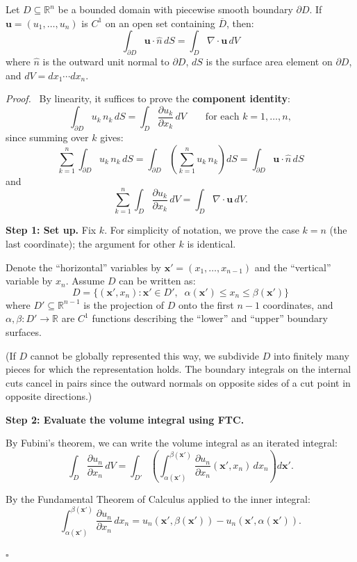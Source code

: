 \documentclass[11pt]{report}
\renewenvironment{proof}[1][Proof]{\par\noindent\textit{#1.}\ }{\hfill$\square$\par\medskip}
\newcommand{\R}{\mathbb{R}}
\newcommand{\parti}[2]{\frac{\partial #1}{\partial #2}}
\begin{document}
\begin{theorem}[Divergence Theorem in $\R^n$]
\label{thm:div-Rn}
Let $D \subseteq \R^n$ be a bounded domain with piecewise smooth boundary $\partial D$. If $\mathbf{u} = (u_1, \ldots, u_n)$ is $C^1$ on an open set containing $\overline{D}$, then:
\[
\boxed{\int_{\partial D} \mathbf{u} \cdot \hat{n} \, dS = \int_D \nabla \cdot \mathbf{u} \, dV}
\]
where $\hat{n}$ is the outward unit normal to $\partial D$, $dS$ is the surface area element on $\partial D$, and $dV = dx_1 \cdots dx_n$.
\end{theorem}

\begin{proof}
By linearity, it suffices to prove the \textbf{component identity}:
\[
\int_{\partial D} u_k \, n_k \, dS = \int_D \parti{u_k}{x_k} \, dV \qquad \text{for each } k = 1, \ldots, n,
\]
since summing over $k$ gives:
\[
\sum_{k=1}^n \int_{\partial D} u_k \, n_k \, dS = \int_{\partial D} \left( \sum_{k=1}^n u_k \, n_k \right) dS = \int_{\partial D} \mathbf{u} \cdot \hat{n} \, dS
\]
and
\[
\sum_{k=1}^n \int_D \parti{u_k}{x_k} \, dV = \int_D \nabla \cdot \mathbf{u} \, dV.
\]

\textbf{Step 1: Set up.} Fix $k$. For simplicity of notation, we prove the case $k = n$ (the last coordinate); the argument for other $k$ is identical.

Denote the ``horizontal'' variables by $\mathbf{x}' = (x_1, \ldots, x_{n-1})$ and the ``vertical'' variable by $x_n$. Assume $D$ can be written as:
\[
D = \{(\mathbf{x}', x_n) : \mathbf{x}' \in D', \;\; \alpha(\mathbf{x}') \leq x_n \leq \beta(\mathbf{x}')\}
\]
where $D' \subseteq \R^{n-1}$ is the projection of $D$ onto the first $n-1$ coordinates, and $\alpha, \beta: D' \to \R$ are $C^1$ functions describing the ``lower'' and ``upper'' boundary surfaces.

(If $D$ cannot be globally represented this way, we subdivide $D$ into finitely many pieces for which the representation holds. The boundary integrals on the internal cuts cancel in pairs since the outward normals on opposite sides of a cut point in opposite directions.)

\textbf{Step 2: Evaluate the volume integral using FTC.}

By Fubini's theorem, we can write the volume integral as an iterated integral:
\[
\int_D \parti{u_n}{x_n} \, dV = \int_{D'} \left( \int_{\alpha(\mathbf{x}')}^{\beta(\mathbf{x}')} \parti{u_n}{x_n}(\mathbf{x}', x_n) \, dx_n \right) d\mathbf{x}'.
\]

By the Fundamental Theorem of Calculus applied to the inner integral:
\[
\int_{\alpha(\mathbf{x}')}^{\beta(\mathbf{x}')} \parti{u_n}{x_n} \, dx_n = u_n(\mathbf{x}', \beta(\mathbf{x}')) - u_n(\mathbf{x}', \alpha(\mathbf{x}')).
\]


\end{proof}
\end{document}
